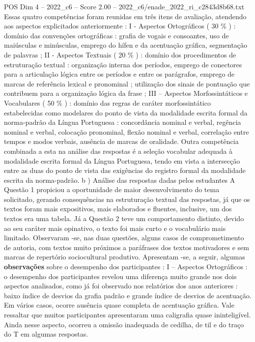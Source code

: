 \begin{textsample}{POS Dim 4 – 2022\_c6 – Score 2.00 – 2022\_c6/enade\_2022\_ri\_c2843d8b68.txt}
Essas quatro competências foram reunidas em três itens de avaliação, atendendo aos aspectos explicitados anteriormente : I - Aspectos Ortográficos ( 30 \% ) : domínio das convenções ortográficas : grafia de vogais e consoantes, uso de maiúsculas e minúsculas, emprego do hífen e da acentuação gráfica, segmentação de palavras ; II - Aspectos Textuais ( 20 \% ) : domínio dos procedimentos de estruturação textual : organização interna dos períodos, emprego de conectores para a articulação lógica entre os períodos e entre os parágrafos, emprego de marcas de referência lexical e pronominal ; utilização dos sinais de pontuação que contribuem para a organização lógica da frase ; III – Aspectos Morfossintáticos e Vocabulares ( 50 \% ) : domínio das regras de caráter morfossintático estabelecidas como modelares do ponto de vista da modalidade escrita formal da norma-padrão da Língua Portuguesa : concordância nominal e verbal, regência nominal e verbal, colocação pronominal, flexão nominal e verbal, correlação entre tempos e modos verbais, ausência de marcas de oralidade.
Outra competência combinada a esta na análise das respostas é a seleção vocabular adequada à modalidade escrita formal da Língua Portuguesa, tendo em vista a intersecção entre as duas do ponto de vista das exigências do registro formal da modalidade escrita da norma-padrão. b ) Análise das respostas dadas pelos estudantes A Questão 1 propiciou a oportunidade de maior desenvolvimento do tema solicitado, gerando consequências na estruturação textual das respostas, já que os textos foram mais expositivos, mais elaborados e fluentes, inclusive, um dos textos era uma tabela.
Já a Questão 2 teve um comportamento distinto, devido ao seu caráter mais opinativo, o texto foi mais curto e o vocabulário mais limitado.
Observaram -se, nas duas questões, alguns casos de comprometimento de autoria, com textos muito próximos a paráfrases dos textos motivadores e sem marcas de repertório sociocultural produtivo.
Apresentam -se, a seguir, algumas \textbf{observações} sobre o desempenho dos participantes : I – Aspectos Ortográficos : o desempenho dos participantes revelou uma diferença muito grande nos dois aspectos analisados, como já foi observado nos relatórios dos anos anteriores : baixo índice de desvios da grafia padrão e grande índice de desvios de acentuação.
Em vários casos, ocorre ausência quase completa de acentuação gráfica.
Vale ressaltar que muitos participantes apresentaram uma caligrafia quase ininteligível.
Ainda nesse aspecto, ocorreu a omissão inadequada de cedilha, de til e do traço do T em algumas respostas.

\end{textsample}
